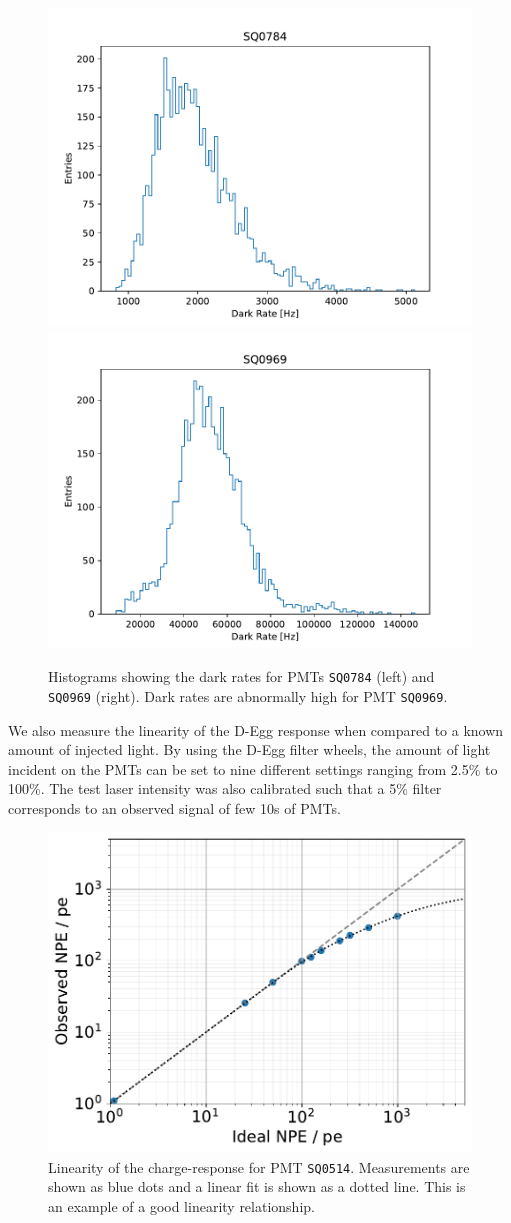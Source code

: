 \documentclass[main.tex]{subfiles}
\begin{document}
\begin{figure}
    \centering
    \includegraphics[width=0.45\linewidth]{./figures/dark_rate_SQ0784.pdf}%
    \includegraphics[width=0.45\linewidth]{./figures/dark_rate_SQ0969.pdf}
    \caption{Histograms showing the dark rates for PMTs \texttt{SQ0784} (left) and \texttt{SQ0969} (right). Dark rates are abnormally high for PMT \texttt{SQ0969}.}\label{fig:dark_rate}
\end{figure}

We also measure the linearity of the D-Egg response when compared to a known amount of injected light. 
By using the D-Egg filter wheels, the amount of light incident on the PMTs can be set to nine different settings ranging from 2.5\% to 100\%. 
The test laser intensity was also calibrated such that a 5\% filter corresponds to an observed signal of few 10s of PMTs. 

\begin{figure}
    \centering
    \includegraphics[width=0.7\linewidth]{figures/SQ0514_NPE_ideal_vs_observed.pdf}
    \caption{Linearity of the charge-response for PMT \texttt{SQ0514}. Measurements are shown as blue dots and a linear fit is shown as a dotted line. This is an example of a good linearity relationship.}
\end{figure}
\end{document}
